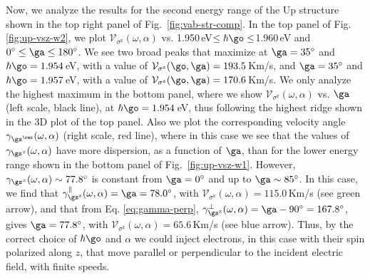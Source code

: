 \documentclass[floatfix,prb,aps,superscriptaddress,showpacs,11pt,preprint,letterpaper]{revtex4}
\begin{document}
Now, we analyze the results for the second energy range of the Up structure
shown in the top right panel of Fig.~\ref{fig:vab-str-comp}. In the top panel
of Fig. \ref{fig:up-vsz-w2}, we plot $\mathcal{V}_{\sigma^{\mathrm{z}}}
(\omega,\alpha)$ vs. 1.950\,eV$\leq\hbar\go\leq$1.960\,eV and
$0^\circ\leq\ga\leq 180^\circ$.
% 
We see two broad peaks that maximize at $\ga=35^{\circ}$ and $\hbar\go=
1.954$\,eV, with a value of $\mathcal{V}_{\sigma^{\mathrm{z}}}(\go,\ga) =
193.5$\,Km/s, and $\ga=35^{\circ}$ and $\hbar\go= 1.957$\,eV, with a value
of $\mathcal{V}_{\sigma^{\mathrm{z}}}(\go,\ga) = 170.6$\,Km/s. 
% 
We only analyze the highest  maximum in the bottom panel, where we  show
$\mathcal{V}_{\sigma^{\mathrm{z}}} (\omega,\alpha)$ vs. $\ga$ (left scale,
black line), at $\hbar\go= 1.954$\,eV, thus following the highest ridge shown
in the 3D plot of the top panel. Also we plot the corresponding
velocity angle $\gamma_{\gs^\rmz}(\omega,\alpha)$ (right scale, red
line),
where in
this case we see that the values of $\gamma_{\gs^z}(\omega,\alpha)$ have more
dispersion, as a function of $\ga$, than for the lower energy range shown in
the bottom panel of Fig.~\ref{fig:up-vsz-w1}.
% 
However, $\gamma_{\gs^z}(\omega,\alpha)\sim 77.8^\circ$ is constant from
$\ga=0^\circ$ and up to $\ga\sim 85^\circ$. In this case, we find that
$\gamma^\parallel_{\gs^\mathrm{z}}(\omega,\alpha)=\ga=78.0^\circ$, with
$\mathcal{V}_{\sigma^{\mathrm{z}}}(\omega,\alpha) = 115.0$\,Km/s (see green
arrow), and that from Eq. \eqref{eq:gamma-perp},
$\gamma^\perp_{\gs^\mathrm{z}}(\omega,\alpha)=\ga-90^\circ=167.8^\circ$, gives
$\ga=77.8^\circ$, with $\mathcal{V}_{\sigma^{\mathrm{z}}}(\omega,\alpha) =
65.6$\,Km/s (see blue arrow). 
% 
Thus, by the correct choice of $\hbar\go$ and $\alpha$ we could inject
electrons, in this case with their spin polarized along $z$, that move parallel
or perpendicular to the incident electric field, with finite speeds.

\end{document}
